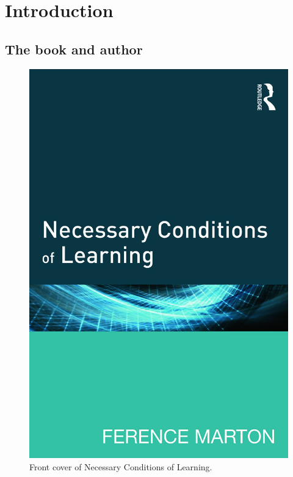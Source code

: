 \mode*

\section{Introduction}

\subsection{The book and author}

\begin{frame}
  \begin{figure}
    \includegraphics[height=0.8\textheight]{fig/book.jpg}
    \caption{Front cover of Necessary Conditions of Learning.}
  \end{figure}
\end{frame}

